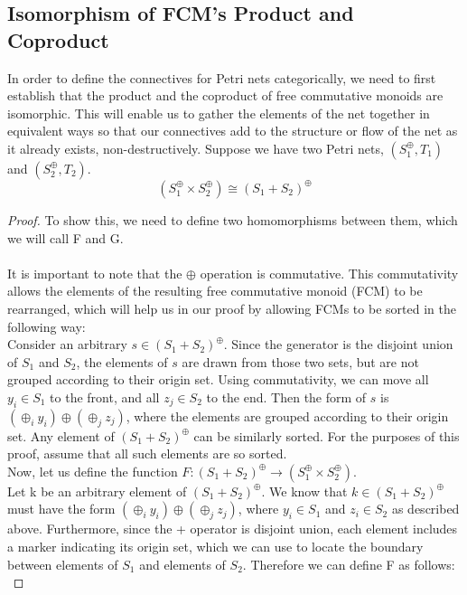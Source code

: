 \begin{lemma}
\section{Isomorphism of FCM's Product and Coproduct} 
In order to define the connectives for Petri nets categorically, we need to first establish that the product and the coproduct of free commutative monoids are isomorphic. This will enable us to gather the elements of the net together in equivalent ways so that our connectives add to the structure or flow of the net as it already exists, non-destructively. 
Suppose we have two Petri nets, $(S_1^\oplus, T_1)$ and $(S_2^\oplus, T_2)$.\\ 
\[(S_1 ^\oplus \times S_2 ^\oplus) \cong (S_1 + S_2)^\oplus\]
\begin{proof}
To show this, we need to define two homomorphisms between them, which we will call F and G.\\
\bigskip\\
It is important to note that the $\oplus$ operation is commutative. This commutativity allows the elements of the resulting free commutative monoid (FCM) to be rearranged, which will help us in our proof by allowing FCMs to be sorted in the following way:\bigskip\\
Consider an arbitrary $s \in (S_1 + S_2)^\oplus$. Since the generator is the disjoint union of $S_1$ and $S_2$, the elements of $s$ are drawn from those two sets, but are not grouped according to their origin set. Using commutativity, we can move all $y_i \in S_1$ to the front, and all $z_j \in S_2$ to the end. Then the form of $s$ is $(\oplus_i y_i) \oplus (\oplus_j z_j)$, where the elements are grouped according to their origin set. Any element of $(S_1 + S_2)^\oplus$ can be similarly sorted. For the purposes of this proof, assume that all such elements are so sorted.\bigskip \\
Now, let us define the function $F: (S_1 + S_2)^\oplus \to (S_1 ^\oplus \times S_2 ^\oplus)$.\\
Let k be an arbitrary element of $(S_1 + S_2)^\oplus$. We know that $k \in (S_1 + S_2)^\oplus$ must have the form $(\oplus_i y_i) \oplus (\oplus_j z_j)$, where $y_i \in S_1$ and $z_i \in S_2$ as described above. Furthermore, since the + operator is disjoint union, each element includes a marker indicating its origin set, which we can use to locate the boundary between elements of $S_1$ and elements of $S_2$. Therefore we can define F as follows:\\

\end{proof}
\end{lemma}
